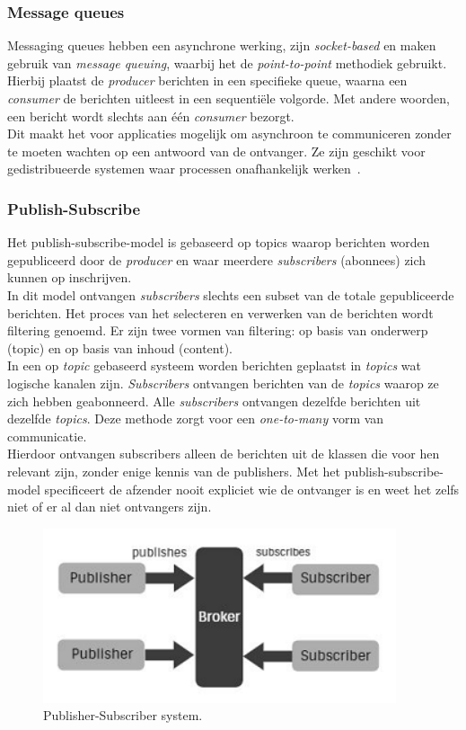 \subsubsection{Message queues} 
Messaging queues hebben een asynchrone werking, zijn \emph{socket-based} en maken gebruik van \emph{message queuing}, 
waarbij het de \emph{point-to-point} methodiek gebruikt.
Hierbij plaatst de \emph{producer} berichten in een specifieke queue, waarna een \emph{consumer} de berichten uitleest in een sequentiële volgorde.
Met andere woorden, een bericht wordt slechts aan één \emph{consumer} bezorgt.
\\
Dit maakt het voor applicaties mogelijk om asynchroon te communiceren zonder te moeten wachten op een antwoord van de ontvanger.
Ze zijn geschikt voor gedistribueerde systemen waar processen onafhankelijk werken~\autocite{Dinari2020}.

\subsubsection{Publish-Subscribe}
Het publish-subscribe-model is gebaseerd op topics waarop berichten worden gepubliceerd door de \emph{producer} 
en waar meerdere \emph{subscribers} (abonnees) zich kunnen op inschrijven. 
\\
In dit model ontvangen \emph{subscribers} slechts een subset van de totale gepubliceerde berichten. 
Het proces van het selecteren en verwerken van de berichten wordt filtering genoemd. 
Er zijn twee vormen van filtering: op basis van onderwerp (topic) en op basis van inhoud (content).
\\
In een op \emph{topic} gebaseerd systeem worden berichten geplaatst in \emph{topics} wat logische kanalen zijn.
\emph{Subscribers} ontvangen berichten van de \emph{topics} waarop ze zich hebben geabonneerd.
Alle \emph{subscribers} ontvangen dezelfde berichten uit dezelfde \emph{topics}. 
Deze methode zorgt voor een \emph{one-to-many} vorm van communicatie.
\\
Hierdoor ontvangen subscribers alleen de berichten uit de klassen die voor hen relevant zijn, zonder enige kennis van de publishers. 
Met het publish-subscribe-model specificeert de afzender nooit expliciet wie de ontvanger is en weet het zelfs niet of er al dan niet ontvangers zijn.

\begin{figure}[h!]
  \centering
  \includegraphics[width=.4\textwidth]{../voorstel/img/fig1-publish-subscribe.png}
  \caption{\label{fig:img}Publisher-Subscriber system\autocite{Sharvari2019}.}
\end{figure}


